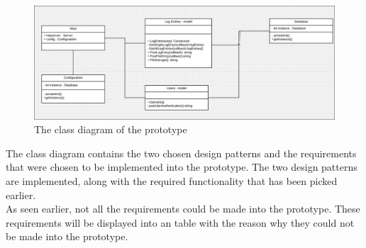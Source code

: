 \documentclass[paper=a4, fontsize=11pt,twoside]{scrartcl}	%
\begin{document}
\begin{figure}[H]
\includegraphics[scale=0.35]{class_diagram}
\caption{The class diagram of the prototype}
\end{figure}
\noindent
The class diagram contains the two chosen design patterns and the requirements that were chosen to be implemented into the prototype. The two design patterns are implemented, along with the required functionality that has been picked earlier.\\
As seen earlier, not all the requirements could be made into the prototype. These requirements will be displayed into an table with the reason why they could not be made into the prototype.
\end{document}
